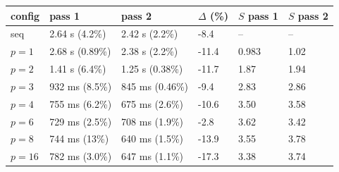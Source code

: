 \begin{tabular}{llllll}
\toprule
config & pass 1 & pass 2 & $\Delta$ (\%) & $S$ pass 1 & $S$ pass 2 \\
\midrule
seq & 2.64 s (4.2\%) & 2.42 s (2.2\%) & -8.4 & -- & -- \\
$p{=}1$ & 2.68 s (0.89\%) & 2.38 s (2.2\%) & -11.4 & 0.983 & 1.02 \\
$p{=}2$ & 1.41 s (6.4\%) & 1.25 s (0.38\%) & -11.7 & 1.87 & 1.94 \\
$p{=}3$ & 932 ms (8.5\%) & 845 ms (0.46\%) & -9.4 & 2.83 & 2.86 \\
$p{=}4$ & 755 ms (6.2\%) & 675 ms (2.6\%) & -10.6 & 3.50 & 3.58 \\
$p{=}6$ & 729 ms (2.5\%) & 708 ms (1.9\%) & -2.8 & 3.62 & 3.42 \\
$p{=}8$ & 744 ms (13\%) & 640 ms (1.5\%) & -13.9 & 3.55 & 3.78 \\
$p{=}16$ & 782 ms (3.0\%) & 647 ms (1.1\%) & -17.3 & 3.38 & 3.74 \\
\bottomrule
\end{tabular}
